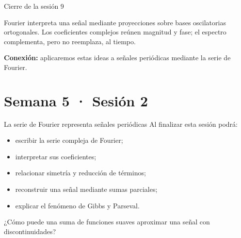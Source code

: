 \documentclass[
  ignorenonframetext,
  aspectratio=169,
  spanish,
  professionalfonts]{beamer}
\providecommand{\tightlist}{%
  \setlength{\itemsep}{0pt}\setlength{\parskip}{0pt}}
\begin{document}
\begin{frame}{Cierre de la sesión 9}
\protect{}\label{cierre-de-la-sesiuxf3n-9}
\begin{tcolorbox}[enhanced jigsaw, arc=.35mm, bottomrule=.15mm, bottomtitle=1mm, breakable, colback=white, colbacktitle=quarto-callout-important-color!10!white, colframe=quarto-callout-important-color-frame, coltitle=black, left=2mm, leftrule=.75mm, opacityback=0, opacitybacktitle=0.6, rightrule=.15mm, title={Síntesis}, titlerule=0mm, toprule=.15mm, toptitle=1mm]

Fourier interpreta una señal mediante proyecciones sobre bases
oscilatorias ortogonales. Los coeficientes complejos reúnen magnitud y
fase; el espectro complementa, pero no reemplaza, al tiempo.

\end{tcolorbox}

\textbf{Conexión:} aplicaremos estas ideas a señales periódicas mediante
la serie de Fourier.
\end{frame}

\section{Semana 5 · Sesión 2}\label{semana-5-sesiuxf3n-2}

\begin{frame}{La serie de Fourier representa señales periódicas}
\protect{}\label{la-serie-de-fourier-representa-seuxf1ales-periuxf3dicas}
Al finalizar esta sesión podrá:

\begin{itemize}
\tightlist
\item
  escribir la serie compleja de Fourier;
\item
  interpretar sus coeficientes;
\item
  relacionar simetría y reducción de términos;
\item
  reconstruir una señal mediante sumas parciales;
\item
  explicar el fenómeno de Gibbs y Parseval.
\end{itemize}

\begin{tcolorbox}[enhanced jigsaw, arc=.35mm, bottomrule=.15mm, bottomtitle=1mm, breakable, colback=white, colbacktitle=quarto-callout-note-color!10!white, colframe=quarto-callout-note-color-frame, coltitle=black, left=2mm, leftrule=.75mm, opacityback=0, opacitybacktitle=0.6, rightrule=.15mm, title={Pregunta inicial}, titlerule=0mm, toprule=.15mm, toptitle=1mm]

¿Cómo puede una suma de funciones suaves aproximar una señal con
discontinuidades?

\end{tcolorbox}
\end{frame}
\end{document}

